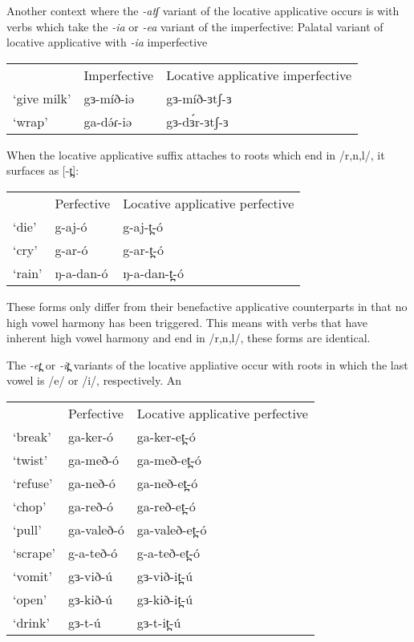Another context where the \textit{-atʃ} variant of the locative applicative occurs is with verbs which take the \textit{-ia} or \textit{-ea} variant of the imperfective:
\ea Palatal variant of locative applicative with \textit{-ia} imperfective 
\begin{tabular}[t]{lll}
& Imperfective & {Locative applicative imperfective} \\
`give milk'  	&  gɜ-míð-iə 	& gɜ-míð-ɜtʃ-ɜ \\ 
`wrap' &  ga-də́ɾ-iə 	& gɜ-dɜ́r-ɜtʃ-ɜ \\ %
\end{tabular}
\z 


When the locative applicative suffix attaches to roots which end in /r,n,l/, it surfaces as [-t̪]:
\ea
\begin{tabular}[t]{lll}
		&	Perfective 	&  Locative applicative perfective \\
`die' 		& 	g-aj-ó 			&	g-aj-t̪-ó\\ 
`cry' 	& 	g-ar-ó		& 	g-ar-t̪-ó \\
`rain' & 	ŋ-a-dan-ó & 	ŋ-a-dan-t̪-ó \\
\end{tabular}
\z

These forms only differ from their benefactive applicative counterparts in that no high vowel harmony has been triggered. This means with verbs that have inherent high vowel harmony and end in /r,n,l/, these forms are identical. %
 
The \textit{-et̪} or \textit{-it̪} variants of the locative appliative occur with roots in which the last vowel is /e/ or /i/, respectively. An

\ea 
\begin{tabular}[t]{lll}
			&	Perfective 		&  	Locative applicative perfective \\
`break' & 	ga-ker-ó 	&	ga-ker-et̪-ó\\ 
`twist' & 	ga-með-ó 	&	ga-með-et̪-ó\\ 
`refuse' & 	ga-neð-ó 	&	ga-neð-et̪-ó\\ 
`chop' & 	ga-reð-ó 	&	ga-reð-et̪-ó\\ 
`pull' 		& 	ga-valeð-ó	& 	ga-valeð-et̪-ó \\
`scrape'	& 	g-a-teð-ó		&  	g-a-teð-et̪-ó \\
`vomit' 		& 	gɜ-við-ú		& 	gɜ-við-it̪-ú		\\
`open' 		& 	gɜ-kið-ú		& 	gɜ-kið-it̪-ú		\\
`drink'	& 	gɜ-t-ú		&  	gɜ-t-it̪-ú \\
\end{tabular} 
\z %

